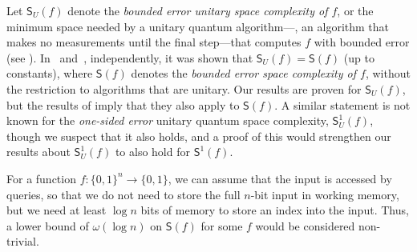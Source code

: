 \documentclass{toc}
\begin{document}
Let $\mathsf{S}_U(f)$ denote the \emph{bounded error unitary space complexity of $f$}, or the minimum space needed by a unitary quantum algorithm---\ie, an algorithm that makes no measurements until the final step---that computes $f$ with bounded error (see ). In~\cite{FR21} and~\cite{GRZ20}, independently, it was shown that $\mathsf{S}_U(f)=\mathsf{S}(f)$ (up to constants), where $\mathsf{S}(f)$ denotes the \emph{bounded error space complexity of $f$}, {without} the restriction to algorithms that are unitary. Our results are proven for $\mathsf{S}_U(f)$, but the results of \cite{FR21,GRZ20} imply that they also apply to $\mathsf{S}(f)$. A similar statement is not known for the \emph{one-sided error} unitary quantum space complexity, $\mathsf{S}^1_U(f)$, though we suspect that it also holds, and a proof of this would strengthen our results about $\mathsf{S}^1_U(f)$ to also hold for $\mathsf{S}^1(f)$. 

For a function $f:\{0,1\}^n\rightarrow\{0,1\}$, we can assume that the input is accessed by queries, so that we do not need to store the full $n$-bit input in working memory, but we need at least $\log n$ bits of memory to store an index into the input. Thus, a lower bound of $\omega(\log n)$ on $\mathsf{S}(f)$ for some $f$ would be considered non-trivial. 
\end{document}
